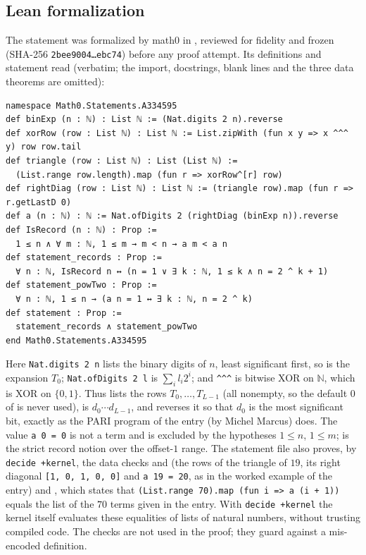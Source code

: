 \documentclass[11pt]{amsart}
\theoremstyle{plain}
\theoremstyle{definition}
\newcommand{\N}{\mathbb{N}}
\begin{document}
\subsection*{Lean formalization}
The statement was formalized by math0 in , reviewed for fidelity and frozen (SHA-256 \texttt{2bee9004\ldots ebc74}) before any proof attempt. Its definitions and statement read (verbatim; the import, docstrings, blank lines and the three data theorems are omitted):
\begin{lstlisting}
namespace Math0.Statements.A334595
def binExp (n : ℕ) : List ℕ := (Nat.digits 2 n).reverse
def xorRow (row : List ℕ) : List ℕ := List.zipWith (fun x y => x ^^^ y) row row.tail
def triangle (row : List ℕ) : List (List ℕ) :=
  (List.range row.length).map (fun r => xorRow^[r] row)
def rightDiag (row : List ℕ) : List ℕ := (triangle row).map (fun r => r.getLastD 0)
def a (n : ℕ) : ℕ := Nat.ofDigits 2 (rightDiag (binExp n)).reverse
def IsRecord (n : ℕ) : Prop :=
  1 ≤ n ∧ ∀ m : ℕ, 1 ≤ m → m < n → a m < a n
def statement_records : Prop :=
  ∀ n : ℕ, IsRecord n ↔ (n = 1 ∨ ∃ k : ℕ, 1 ≤ k ∧ n = 2 ^ k + 1)
def statement_powTwo : Prop :=
  ∀ n : ℕ, 1 ≤ n → (a n = 1 ↔ ∃ k : ℕ, n = 2 ^ k)
def statement : Prop :=
  statement_records ∧ statement_powTwo
end Math0.Statements.A334595
\end{lstlisting}
Here \texttt{Nat.digits 2 n} lists the binary digits of $n$, least significant first, so  is the expansion $T_0$; \texttt{Nat.ofDigits 2 l} is $\sum_i l_i2^i$; and \texttt{\^{}\^{}\^{}} is bitwise XOR on $\N$, which is XOR on $\{0,1\}$. Thus  lists the rows $T_0,\dots,T_{L-1}$ (all nonempty, so the default $0$ of  is never used),  is $d_0\cdots d_{L-1}$, and  reverses it so that $d_0$ is the most significant bit, exactly as the PARI program of the entry (by Michel Marcus) does. The value \texttt{a 0 = 0} is not a term and is excluded by the hypotheses $1\le n$, $1\le m$;  is the strict record notion over the offset-$1$ range.
The statement file also proves, by \texttt{decide +kernel}, the data checks  and  (the rows of the triangle of $19$, its right diagonal \texttt{[1, 0, 1, 0, 0]} and \texttt{a 19 = 20}, as in the worked example of the entry) and , which states that \texttt{(List.range 70).map (fun i => a (i + 1))} equals the list of the $70$ terms given in the entry. With \texttt{decide +kernel} the kernel itself evaluates these equalities of lists of natural numbers, without trusting compiled code. The checks are not used in the proof; they guard against a mis-encoded definition.
\end{document}
